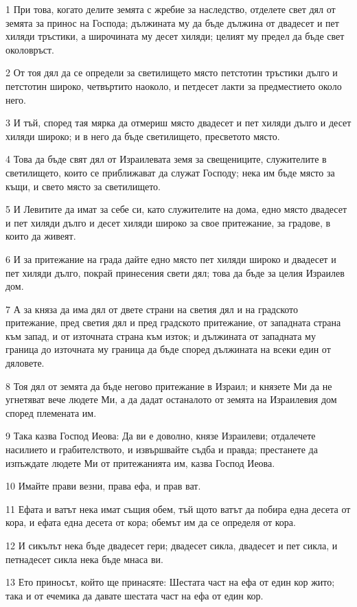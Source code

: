 \par 1 При това, когато делите земята с жребие за наследство, отделете свет дял от земята за принос на Господа; дължината му да бъде дължина от двадесет и пет хиляди тръстики, а широчината му десет хиляди; целият му предел да бъде свет околовръст.
\par 2 От тоя дял да се определи за светилището място петстотин тръстики дълго и петстотин широко, четвъртито наоколо, и петдесет лакти за предместието около него.
\par 3 И тъй, според тая мярка да отмериш място двадесет и пет хиляди дълго и десет хиляди широко; и в него да бъде светилището, пресветото място.
\par 4 Това да бъде свят дял от Израилевата земя за свещениците, служителите в светилището, които се приближават да служат Господу; нека им бъде място за къщи, и свето място за светилището.
\par 5 И Левитите да имат за себе си, като служителите на дома, едно място двадесет и пет хиляди дълго и десет хиляди широко за свое притежание, за градове, в които да живеят.
\par 6 И за притежание на града дайте едно място пет хиляди широко и двадесет и пет хиляди дълго, покрай принесения свети дял; това да бъде за целия Израилев дом.
\par 7 А за княза да има дял от двете страни на светия дял и на градското притежание, пред светия дял и пред градското притежание, от западната страна към запад, и от източната страна към изток; и дължината от западната му граница до източната му граница да бъде според дължината на всеки един от дяловете.
\par 8 Тоя дял от земята да бъде негово притежание в Израил; и князете Ми да не угнетяват вече людете Ми, а да дадат останалото от земята на Израилевия дом според племената им.
\par 9 Така казва Господ Иеова: Да ви е доволно, князе Израилеви; отдалечете насилието и грабителството, и извършвайте съдба и правда; престанете да изпъждате людете Ми от притежанията им, казва Господ Иеова.
\par 10 Имайте прави везни, права ефа, и прав ват.
\par 11 Ефата и ватът нека имат същия обем, тъй щото ватът да побира една десета от кора, и ефата една десета от кора; обемът им да се определя от кора.
\par 12 И сикълът нека бъде двадесет гери; двадесет сикла, двадесет и пет сикла, и петнадесет сикла нека бъде мнаса ви.
\par 13 Ето приносът, който ще принасяте: Шестата част на ефа от един кор жито; така и от ечемика да давате шестата част на ефа от един кор.
